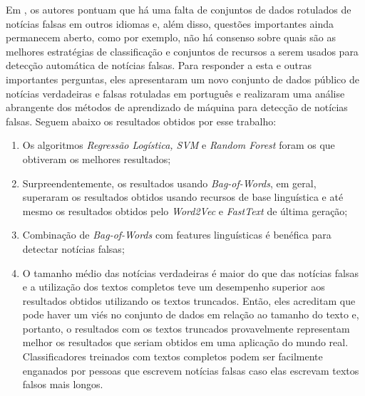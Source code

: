 Em \citet{Silva2020}, os autores pontuam que há uma falta de conjuntos de dados rotulados de notícias falsas em outros idiomas e, além disso, questões importantes ainda permanecem aberto, como por exemplo, não há consenso sobre quais são as melhores estratégias de classificação e conjuntos de recursos a serem usados para detecção automática de notícias falsas. Para responder a esta e outras importantes perguntas, eles apresentaram um novo conjunto de dados público de notícias verdadeiras e falsas rotuladas em português e realizaram uma análise abrangente dos métodos de aprendizado de máquina para detecção de notícias falsas. Seguem abaixo os resultados obtidos por esse trabalho:
\begin{enumerate}
    \item Os algoritmos \textit{ Regressão Logística, SVM} e \textit{Random Forest} foram os que obtiveram os melhores resultados;
    \item Surpreendentemente, os resultados usando \textit{Bag-of-Words}, em geral, superaram os resultados obtidos usando recursos de base linguística e até mesmo os resultados obtidos pelo \textit{Word2Vec} e \textit{FastText} de última geração;
    \item Combinação de \textit{Bag-of-Words} com features linguísticas é benéfica para detectar notícias falsas;
    
    \item O tamanho médio das notícias verdadeiras é maior do que das notícias falsas e a utilização dos textos completos teve um desempenho superior aos resultados obtidos utilizando os textos truncados.  Então, eles acreditam que pode haver um viés no conjunto de dados em relação ao tamanho do texto e, portanto, o resultados com os textos truncados provavelmente representam melhor os resultados que seriam obtidos em uma aplicação do mundo real. Classificadores treinados com textos completos podem ser facilmente enganados por pessoas que escrevem notícias falsas caso elas escrevam textos falsos mais longos.
\end{enumerate}



